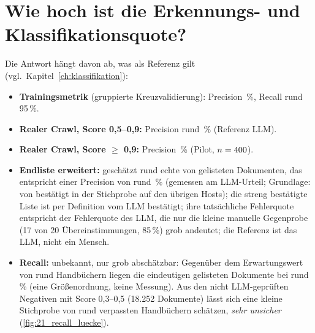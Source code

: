 \section{Wie hoch ist die Erkennungs- und Klassifikationsquote?}
Die Antwort hängt davon ab, was als Referenz gilt (vgl.\ Kapitel~\ref{ch:klassifikation}):
\begin{itemize}
  \item \textbf{Trainingsmetrik} (gruppierte Kreuzvalidierung): Precision \zTrainPrec\,\%, Recall rund 95\,\%.
  \item \textbf{Realer Crawl, Score 0,5--0,9:} Precision rund \zMidPrec\,\% (Referenz LLM).
  \item \textbf{Realer Crawl, Score $\ge$ 0,9:} Precision \zPilotPct\,\% (Pilot, $n=400$).
  \item \textbf{Endliste erweitert:} geschätzt rund \zEstTrue{} echte von \zFinalListed{} gelisteten Dokumenten, das entspricht einer Precision von rund \zPrecisionEnd\,\% (gemessen am LLM-Urteil; Grundlage: \zNonSuspectOK{} von \zNonSuspectN{} bestätigt in der Stichprobe auf den übrigen Hosts); die streng bestätigte Liste ist per Definition vom LLM bestätigt; ihre tatsächliche Fehlerquote entspricht der Fehlerquote des LLM, die nur die kleine manuelle Gegenprobe (17 von 20 Übereinstimmungen, 85\,\%) grob andeutet; die Referenz ist das LLM, nicht ein Mensch.
  \item \textbf{Recall:} unbekannt, nur grob abschätzbar: Gegenüber dem Erwartungswert von rund \zZielwert{} Handbüchern liegen die \zUniqueLikely{} eindeutigen gelisteten Dokumente bei rund \zRecallPct\,\% (eine Größenordnung, keine Messung). Aus den nicht LLM-geprüften Negativen mit Score 0,3--0,5 (18.252 Dokumente) lässt sich eine kleine Stichprobe von rund \zRecallMissed{} verpassten Handbüchern schätzen, \emph{sehr unsicher} (\cref{fig:21_recall_luecke}).
\end{itemize}


